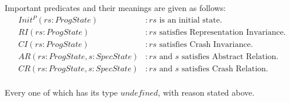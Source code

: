 \documentclass[a4paper,11pt]{article}
\theoremstyle{definition}
\begin{document}
Important predicates and their meanings are given as follows:
\begin{align*}
	\mathit{Init^P(rs : ProgState)} &: \text{$\mathit{rs}$ is an initial state.}\\
	\mathit{RI(rs : ProgState)} &: \text{$\mathit{rs}$ satisfies Representation Invariance.} \\
	\mathit{CI(rs : ProgState)} &: \text{$\mathit{rs}$ satisfies Crash Invariance.} \\
	\mathit{AR(rs : ProgState, s : SpecState)} &: \text{$\mathit{rs}$ and $s$ satisfies Abstract Relation.} \\
	\mathit{CR(rs : ProgState, s : SpecState)} &: \text{$\mathit{rs}$ and $s$ satisfies Crash Relation.} \\
\end{align*}

Every one of which has its type $\mathit{undefined}$, with reason stated above. 
\end{document}

